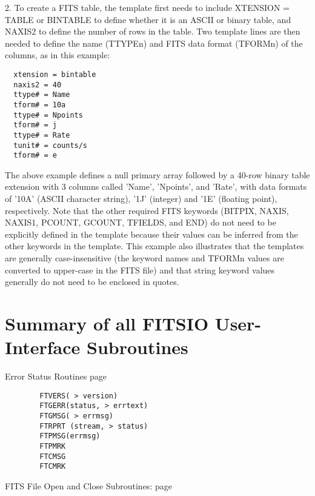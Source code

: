\documentclass[11pt]{book}
\begin{document}
2.  To create a FITS  table, the template first needs to include
XTENSION = TABLE or BINTABLE to define whether it is an ASCII or binary
table, and NAXIS2 to define the number of rows in the table.  Two
template lines are then needed to define the name (TTYPEn) and FITS data
format (TFORMn) of the columns, as in this example:

\begin{verbatim}
  xtension = bintable
  naxis2 = 40
  ttype# = Name
  tform# = 10a
  ttype# = Npoints
  tform# = j
  ttype# = Rate
  tunit# = counts/s
  tform# = e
\end{verbatim}
The above example defines a null primary array followed by a 40-row
binary table extension with 3 columns called 'Name', 'Npoints', and
'Rate', with data formats of '10A' (ASCII character string), '1J'
(integer) and '1E' (floating point), respectively.  Note that the other
required FITS keywords (BITPIX, NAXIS, NAXIS1, PCOUNT, GCOUNT, TFIELDS,
and END) do not need to be explicitly defined in the template because
their values can be inferred from the other keywords in the template.
This example also illustrates that the templates are generally
case-insensitive (the keyword names and TFORMn values are converted to
upper-case in the FITS file) and that string keyword values generally
do not need to be enclosed in quotes.


\chapter{  Summary of all FITSIO User-Interface Subroutines }

 Error Status Routines  page~\pageref{FTVERS}

\begin{verbatim}
        FTVERS( > version)
        FTGERR(status, > errtext)
        FTGMSG( > errmsg)
        FTRPRT (stream, > status)
        FTPMSG(errmsg)
        FTPMRK
        FTCMSG
        FTCMRK
\end{verbatim}
 FITS File Open and Close Subroutines: page~\pageref{FTOPEN}
\end{document}
